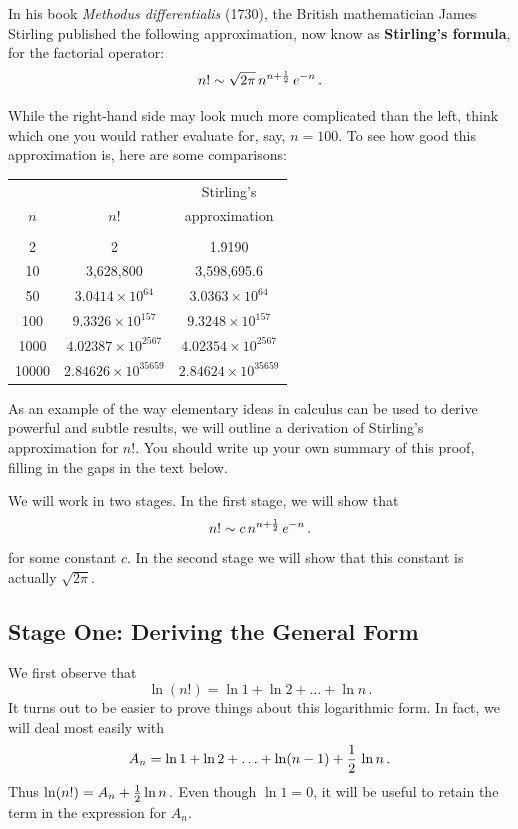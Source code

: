 {{{{In his book {\em Methodus differentialis\/} (1730), the British mathematician James Stirling published the following approximation, now know as {\bf Stirling's formula}, for the factorial operator:
\[
n!\sim \sqrt{2\pi}\,n^{n+{1 \over 2}}\,e^{-n} \,.
\]

While the right-hand side may look much more complicated than the left, think which one you would rather evaluate for, say, $n=100$. To see how good this approximation is, here are some comparisons:

\begin{center}


\begin{tabular}{ccc}\label{table}
&&Stirling's \\
$n$&$n!$&approximation \\ [2pt]
\hline\\[-10pt]
2&2&1.9190   \\
10 & 3,628,800   & 3,598,695.6\\
50 & $3.0414\times 10^{64}$   & $3.0363\times 10^{64}$\\
100 & $9.3326\times 10^{157}$   & $9.3248\times 10^{157}$\\
1000 & $4.02387\times 10^{2567}$   & $4.02354\times 10^{2567}$\\
10000& $2.84626\times 10^{35659}$ & $2.84624\times 10^{35659}$ \\
\end{tabular}
\end{center}

As an example of the way elementary ideas in calculus can be used to derive powerful and subtle results, we will outline a derivation of Stirling's approximation for $n!$.  You should write up your own summary of this proof, filling in the gaps in the text below.

We will work in two stages.  In the first stage, we will show that
\[
n!\sim c\,n^{n+{1 \over 2}}\,e^{-n} \,.
\]
for some constant $c$.  In the second stage we will show that this constant is actually $\sqrt{2\pi}$.

\subsection{Stage One: Deriving the General Form}

We first observe that
\[
\ln (n!) = \ln 1 + \ln 2 + \ldots +\ln n \,.
\]
It turns out to be easier to prove things about this logarithmic form.  In fact, we will deal most easily with
\[
A_n=\ln 1 + \ln 2 + \ldots +\ln (n-1) + {1 \over 2}\,\ln n  \,.
\]
Thus $\ln(n!) = A_n+{1 \over 2}\ln n \,.$  Even though $\ln 1 = 0$, it will be useful to retain the term in the expression for $A_n$.

}}}}

